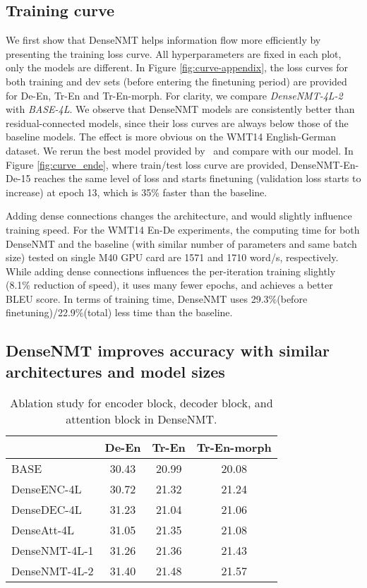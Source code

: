 \documentclass[11pt,a4paper]{article}
\begin{document}
\subsection{Training curve}
We first show that DenseNMT helps information flow more efficiently by presenting the training loss curve. 
All hyperparameters are fixed in each plot, only the models are different. 
In Figure \ref{fig:curve-appendix}, the loss curves for both training and dev sets (before entering the finetuning period) are provided for De-En, Tr-En and Tr-En-morph. 
For clarity, we compare \emph{DenseNMT-4L-2} with \emph{BASE-4L}. 
We observe that DenseNMT models are consistently better than residual-connected models, since their loss curves are always below those of the baseline models. 
The effect is more obvious  on the WMT14 English-German dataset. We rerun the best model provided by~\cite{convs2s} and compare with our model. 
In Figure \ref{fig:curve_ende}, where train/test loss curve are provided, DenseNMT-En-De-15 reaches the same level of loss and starts finetuning (validation loss starts to increase) at epoch 13, which is 35\% faster than the baseline. 

Adding dense connections changes the architecture, and would slightly influence training speed. For the WMT14 En-De experiments, the computing time for both DenseNMT and the baseline (with similar number of parameters and same batch size) tested on single M40 GPU card are 1571 and 1710 word/s, respectively. While adding dense connections influences the per-iteration training slightly (8.1\% reduction of speed), it uses many fewer epochs, and achieves a better BLEU score. In terms of training time, DenseNMT uses 29.3\%(before finetuning)/22.9\%(total) less time than the baseline.

\subsection{DenseNMT improves accuracy with similar architectures and model sizes}



\begin{table}[htbp]
\small
\centering
\captionsetup{font=small}
\begin{tabular}{lccc}
\toprule
 & \textbf{De-En}  & \textbf{Tr-En} & \textbf{Tr-En-morph}\\
\midrule
BASE & 30.43 & 20.99 & 20.08 \\
DenseENC-4L & 30.72 & 21.32 & 21.24   \\ 
DenseDEC-4L & 31.23 & 21.04 & 21.06  \\
DenseAtt-4L & 31.05 & 21.35 & 21.08  \\
DenseNMT-4L-1 & 31.26 & 21.36 & 21.43 \\ 
DenseNMT-4L-2 & 31.40 & 21.48 & 21.57\\ 
\bottomrule
\end{tabular}
\caption{ Ablation study for encoder block, decoder block, and attention block in DenseNMT.}
\label{tab:ablation}
\end{table}
\end{document}
